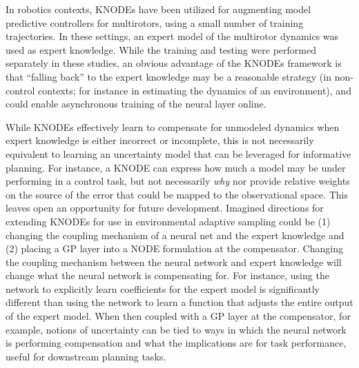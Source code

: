 In robotics contexts, KNODEs have been utilized for augmenting model predictive controllers for multirotors, using a small number of training trajectories. In these settings, an expert model of the multirotor dynamics was used as expert knowledge\autocite{chee2022knode}. While the training and testing were performed separately in these studies, an obvious advantage of the KNODEs framework is that ``falling back'' to the expert knowledge may be a reasonable strategy (in non-control contexts; for instance in estimating the dynamics of an environment), and could enable asynchronous training of the neural layer online. 

While KNODEs effectively learn to compensate for unmodeled dynamics when expert knowledge is either incorrect or incomplete, this is not necessarily equivalent to learning an uncertainty model that can be leveraged for informative planning. For instance, a KNODE can express how much a model may be under performing in a control task, but not necessarily \emph{why} nor provide relative weights on the source of the error that could be mapped to the observational space. This leaves open an opportunity for future development. Imagined directions for extending KNODEs for use in environmental adaptive sampling could be (1) changing the coupling mechanism of a neural net and the expert knowledge and (2) placing a GP layer into a NODE formulation at the compensator. Changing the coupling mechanism between the neural network and expert knowledge will change what the neural network is compensating for. For instance, using the network to explicitly learn coefficients for the expert model is significantly different than using the network to learn a function that adjusts the entire output of the expert model. When then coupled with a GP layer at the compensator, for example, notions of uncertainty can be tied to ways in which the neural network is performing compensation and what the implications are for task performance, useful for downstream planning tasks. 




